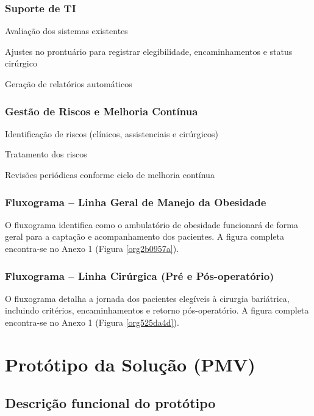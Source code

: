 \documentclass[12pt]{article}
\begin{document}
\subsubsection{Suporte de TI}
\label{sec:org53fb767}
\begin{hlevelthree}
\item Avaliação dos sistemas existentes
\item Ajustes no prontuário para registrar elegibilidade, encaminhamentos e status cirúrgico
\item Geração de relatórios automáticos
\end{hlevelthree}

\subsubsection{Gestão de Riscos e Melhoria Contínua}
\label{sec:orgff9f7d0}
\begin{hlevelthree}
\item Identificação de riscos (clínicos, assistenciais e cirúrgicos)
\item Tratamento dos riscos
\item Revisões periódicas conforme ciclo de melhoria contínua
\end{hlevelthree}

\subsubsection{Fluxograma – Linha Geral de Manejo da Obesidade}
\label{sec:orgdc4317f}
O fluxograma identifica como o ambulatório de obesidade funcionará de forma geral para a captação e acompanhamento dos pacientes.
A figura completa encontra-se no Anexo 1 (Figura \ref{org2b0957a}).

\subsubsection{Fluxograma – Linha Cirúrgica (Pré e Pós-operatório)}
\label{sec:orgb4d6180}
O fluxograma detalha a jornada dos pacientes elegíveis à cirurgia bariátrica, incluindo critérios, encaminhamentos e retorno pós-operatório.
A figura completa encontra-se no Anexo 1 (Figura \ref{org525da4d}).

\FGVNewPage

\section{Protótipo da Solução (PMV)}
\label{sec:org3b87928}
\subsection{Descrição funcional do protótipo}
\label{sec:org5c738b0}
\end{document}
